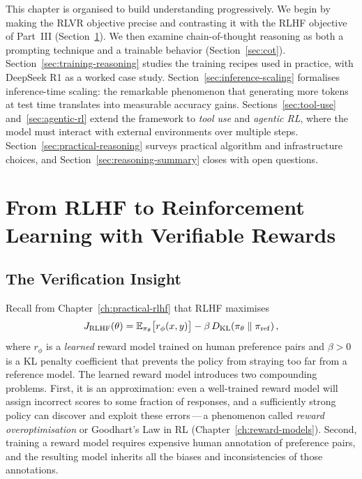 This chapter is organised to build understanding progressively. We begin
by making the RLVR objective precise and contrasting it with
the RLHF objective of Part~III
(Section~\ref{sec:rlvr-ch15}). We then examine chain-of-thought
reasoning as both a prompting technique and a trainable
behavior (Section~\ref{sec:cot}). Section~\ref{sec:training-reasoning}
studies the training recipes used in practice, with DeepSeek R1 as a
worked case study. Section~\ref{sec:inference-scaling} formalises
inference-time scaling: the remarkable phenomenon that generating more
tokens at test time translates into measurable accuracy gains.
Sections~\ref{sec:tool-use} and~\ref{sec:agentic-rl} extend the
framework to \emph{tool use} and \emph{agentic
RL}, where the model must interact with
external environments over multiple steps. Section~\ref{sec:practical-reasoning}
surveys practical algorithm and infrastructure choices, and
Section~\ref{sec:reasoning-summary} closes with open questions.

\section{From RLHF to Reinforcement Learning with Verifiable Rewards}
\label{sec:rlvr-ch15}

\subsection{The Verification Insight}

Recall from Chapter~\ref{ch:practical-rlhf} that RLHF maximises
\begin{equation}
\label{eq:rlhf-objective-ch15}
J_{\mathrm{RLHF}}(\theta)
  = \operatorname{\mathbb{E}}_{\pi_\theta}\bigl[r_\phi(x, y)\bigr]
  - \beta\,D_{\mathrm{KL}}\!\left(\pi_\theta\;\|\;\pi_{\mathrm{ref}}\right),
\end{equation}
where $r_\phi$ is a \emph{learned} reward model trained on human
preference pairs and $\beta > 0$ is a KL penalty coefficient that
prevents the policy from straying too far from a reference model.
The learned reward model introduces two compounding problems. First, it
is an approximation: even a well-trained reward model will assign
incorrect scores to some fraction of responses, and a sufficiently
strong policy can discover and exploit these errors\,---\,a phenomenon
called \emph{reward overoptimisation}
or Goodhart's Law in RL (Chapter~\ref{ch:reward-models}). Second,
training a reward model requires expensive human annotation of
preference pairs, and the resulting model inherits all the biases and
inconsistencies of those annotations.

